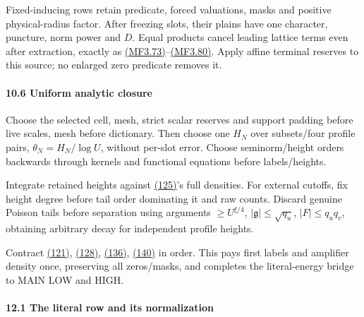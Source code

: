Fixed-inducing rows retain predicate, forced valuations, masks and positive physical-radius factor. After freezing slots, their plains have one character, puncture, norm power and \(D\). Equal products cancel leading lattice terms even after extraction, exactly as \protect\hyperlink{mf:eq:B3.73}{(MF3.73)}--\protect\hyperlink{mf:eq:B3.80}{(MF3.80)}. Apply affine terminal reserves to this source; no enlarged zero predicate removes it.

\hypertarget{sr:uniformity}{}

\label{sr:uniformity}

\hypertarget{uniform-analytic-closure}{%
\paragraph{10.6 Uniform analytic closure}\label{uniform-analytic-closure}}

Choose the selected cell, mesh, strict scalar reserves and support padding before live scales, mesh before dictionary. Then choose one \(H_N\) over subsets/four profile pairs, \(\theta_N=H_N/\log U\), without per-slot error. Choose seminorm/height orders backwards through kernels and functional equations before labels/heights.

Integrate retained heights against \protect\hyperlink{sr:full-kernel}{(125)}'s full densities. For external cutoffs, fix height degree before tail order dominating it and raw counts. Discard genuine Poisson tails before separation using arguments \(\ge U^{\xi/4}\), \(|\mathfrak g|\le\sqrt{q_u}\), \(|F|\le q_uq_v\), obtaining arbitrary decay for independent profile heights.

Contract \protect\hyperlink{sr:physical-mass}{(121)}, \protect\hyperlink{sr:allocation-weight}{(128)}, \protect\hyperlink{sr:amplified-budget}{(136)}, \protect\hyperlink{sr:inner-allowance}{(140)} in order. This pays first labels and amplifier density once, preserving all zeros/masks, and completes the literal-energy bridge to MAIN LOW and HIGH.

\hypertarget{s60:chapter}{}

\label{s60:chapter}

\hypertarget{ma:definitions}{}

\label{ma:definitions}

\hypertarget{the-literal-row-and-its-normalization}{%
\paragraph{12.1 The literal row and its normalization}\label{the-literal-row-and-its-normalization}}


